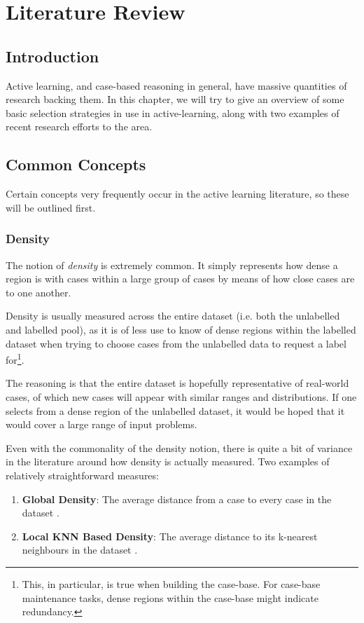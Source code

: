 \documentclass[a4paper,11pt]{report}
\begin{document}
\chapter{Literature Review\label{cha:litreview}}
\section{Introduction}
Active learning, and case-based reasoning in general, have massive quantities of research backing them. In this chapter, we will try to give an overview of some basic selection strategies in use in active-learning, along with two examples of recent research efforts to the area.

\section{Common Concepts}
Certain concepts very frequently occur in the active learning literature, so these will be outlined first.

\subsection{Density}
The notion of \emph{density} is extremely common. It simply represents how dense a region is with cases within a large group of cases by means of how close cases are to one another.

Density is usually measured across the entire dataset (i.e. both the unlabelled and labelled pool), as it is of less use to know of dense regions within the labelled dataset when trying to choose cases from the unlabelled data to request a label for\footnote{This, in particular, is true when building the case-base. For case-base maintenance tasks, dense regions within the case-base might indicate redundancy.}. 

The reasoning is that the entire dataset is hopefully representative of real-world cases, of which new cases will appear with similar ranges and distributions. If one selects from a dense region of the unlabelled dataset, it would be hoped that it would cover a large range of input problems.

\begin{samepage}
Even with the commonality of the density notion, there is quite a bit of variance in the literature around how density is actually measured. Two examples of relatively straightforward measures:
\begin{enumerate}
	\item \textbf{Global Density}: The average distance from a case to every case in the dataset \citep{Xu2007}.
	\item \textbf{Local KNN Based Density}: The average distance to its k-nearest neighbours in the dataset \citep{Zhu2008}.
\end{enumerate}
\end{samepage}
\end{document}
